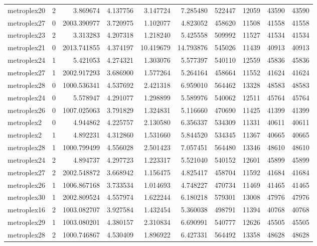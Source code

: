 \begin{longtable}{|l|r|r|r|r|r|r|r|r|r|}
metroplex20 & 2 & 3.869674 & 4.137756 & 3.147724 & 7.285480 & 522447 & 12059 & 43590 & 43590 \\
metroplex27 & 0 & 2003.390977 & 3.720975 & 1.102077 & 4.823052 & 458620 & 11508 & 41558 & 41558 \\
metroplex23 & 2 & 3.313283 & 4.207318 & 1.218240 & 5.425558 & 509992 & 11527 & 41534 & 41534 \\
metroplex21 & 0 & 2013.741855 & 4.374197 & 10.419679 & 14.793876 & 545026 & 11439 & 40913 & 40913 \\
metroplex24 & 1 & 5.421053 & 4.274321 & 1.303076 & 5.577397 & 540110 & 12559 & 45836 & 45836 \\
metroplex27 & 1 & 2002.917293 & 3.686900 & 1.577264 & 5.264164 & 458664 & 11552 & 41624 & 41624 \\
metroplex28 & 0 & 1000.536341 & 4.537692 & 2.421318 & 6.959010 & 564462 & 13328 & 48583 & 48583 \\
metroplex24 & 0 & 5.578947 & 4.291077 & 1.298899 & 5.589976 & 540062 & 12511 & 45764 & 45764 \\
metroplex26 & 0 & 1007.025063 & 3.791829 & 1.324831 & 5.116660 & 470690 & 11425 & 41399 & 41399 \\
metroplex2 & 0 & 4.944862 & 4.225757 & 2.130580 & 6.356337 & 534309 & 11331 & 40611 & 40611 \\
metroplex2 & 1 & 4.892231 & 4.312860 & 1.531660 & 5.844520 & 534345 & 11367 & 40665 & 40665 \\
metroplex28 & 1 & 1000.799499 & 4.556028 & 2.501423 & 7.057451 & 564480 & 13346 & 48610 & 48610 \\
metroplex24 & 2 & 4.894737 & 4.297723 & 1.223317 & 5.521040 & 540152 & 12601 & 45899 & 45899 \\
metroplex27 & 2 & 2002.548872 & 3.668942 & 1.156475 & 4.825417 & 458704 & 11592 & 41684 & 41684 \\
metroplex26 & 1 & 1006.867168 & 3.733534 & 1.014693 & 4.748227 & 470734 & 11469 & 41465 & 41465 \\
metroplex30 & 1 & 2002.809524 & 4.557974 & 1.622244 & 6.180218 & 579301 & 13008 & 47976 & 47976 \\
metroplex16 & 2 & 1003.082707 & 3.927584 & 1.432454 & 5.360038 & 498791 & 11394 & 40768 & 40768 \\
metroplex29 & 1 & 1003.080201 & 4.380157 & 2.310834 & 6.690991 & 540777 & 12626 & 45505 & 45505 \\
metroplex28 & 2 & 1000.746867 & 4.530409 & 1.896922 & 6.427331 & 564492 & 13358 & 48628 & 48628 \\

\end{longtable}
